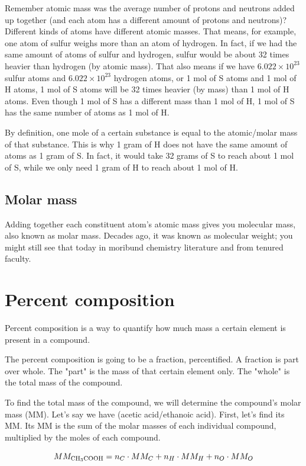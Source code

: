 \documentclass[letterpaper, 12pt]{article}
\begin{document}
	Remember atomic mass was the average number of protons and neutrons added up together (and each atom has a different amount of protons and neutrons)? Different kinds of atoms have different atomic masses. That means, for example, one atom of sulfur weighs more than an atom of hydrogen. In fact, if we had the same amount of atoms of sulfur and hydrogen, sulfur would be about 32 times heavier than hydrogen (by atomic mass). That also means if we have $6.022 \times 10^{23}$ sulfur atoms and $6.022 \times 10^{23}$ hydrogen atoms, or 1 mol of S atoms and 1 mol of H atoms, 1 mol of S atoms will be 32 times heavier (by mass) than 1 mol of H atoms. Even though 1 mol of S has a different mass than 1 mol of H, 1 mol of S has the same number of atoms as 1 mol of H.
	
	By definition, one mole of a certain substance is equal to the atomic/molar mass of that substance. This is why 1 gram of H does not have the same amount of atoms as 1 gram of S. In fact, it would take 32 grams of S to reach about 1 mol of S, while we only need 1 gram of H to reach about 1 mol of H.

	\subsection{Molar mass}
	Adding together each constituent atom's atomic mass gives you molecular mass, also known as molar mass. Decades ago, it was known as molecular weight; you might still see that today in moribund chemistry literature and from tenured faculty.

\section{Percent composition}
Percent composition is a way to quantify how much mass a certain element is present in a compound.

The percent composition is going to be a fraction, percentified. A fraction is part over whole. The "part" is the mass of that certain element only. The "whole" is the total mass of the compound.

To find the total mass of the compound, we will determine the compound's molar mass (MM). Let's say we have  (acetic acid/ethanoic acid). First, let's find its MM. Its MM is the sum of the molar masses of each individual compound, multiplied by the moles of each compound.

$$MM_{\ce{CH3COOH}} = n_{C} \cdot MM_{C} + n_{H} \cdot MM_{H} + n_{O} \cdot MM_{O}$$
\end{document}
